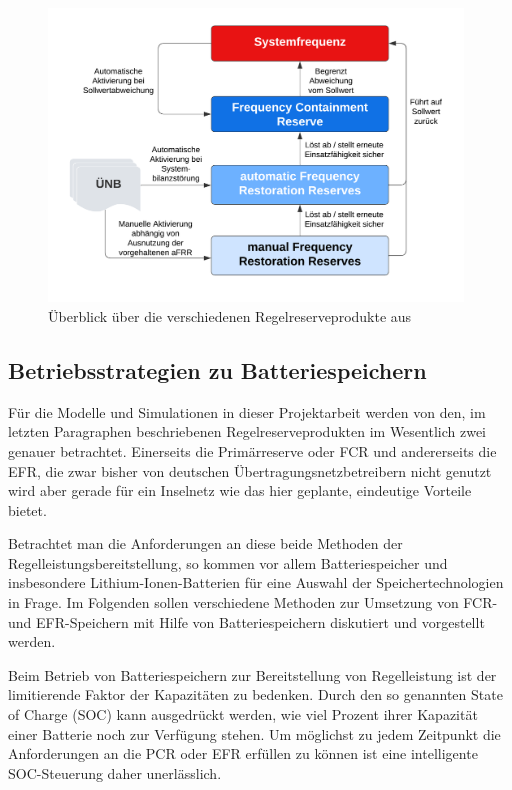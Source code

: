 \begin{figure}[h!]
    \centering
    \includegraphics[width=11cm]{Abbildungen/_Flussdiagramm (1).png}
    \caption{Überblick über die verschiedenen Regelreserveprodukte aus~\parencite{cronenberg_beschreibung_nodate}}\label{Fluss}
\end{figure}


\subsection{Betriebsstrategien zu Batteriespeichern}\label{Betriebsstrategien}

Für die Modelle und Simulationen in dieser Projektarbeit werden von den, im letzten Paragraphen beschriebenen Regelreserveprodukten
im Wesentlich zwei genauer betrachtet.
Einerseits die Primärreserve oder FCR und andererseits die EFR, die zwar bisher von deutschen Übertragungsnetzbetreibern nicht genutzt wird
aber gerade für ein Inselnetz wie das hier geplante, eindeutige Vorteile bietet.

Betrachtet man die Anforderungen an diese beide Methoden der Regelleistungsbereitstellung, so kommen vor allem
Batteriespeicher und insbesondere Lithium-Ionen-Batterien für eine Auswahl der Speichertechnologien in Frage.
Im Folgenden sollen verschiedene Methoden zur Umsetzung von FCR- und EFR-Speichern mit Hilfe von Batteriespeichern 
diskutiert und vorgestellt werden.

Beim Betrieb von Batteriespeichern zur Bereitstellung von Regelleistung ist der limitierende Faktor der Kapazitäten zu bedenken.
Durch den so genannten State of Charge (SOC) kann ausgedrückt werden, wie viel Prozent ihrer Kapazität einer Batterie noch zur Verfügung stehen.
Um möglichst zu jedem Zeitpunkt die Anforderungen an die PCR oder EFR erfüllen zu können ist eine intelligente
SOC-Steuerung daher unerlässlich.

